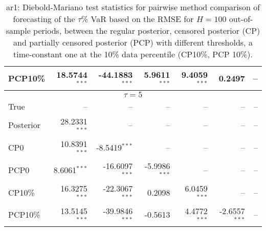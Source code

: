 {{\begin{table}
\begin{tabular}{l | rrrrrr}
PCP10\% & 18.5744$^{***}$ & -44.1883$^{***}$ & 5.9611$^{***}$ & 9.4059$^{***}$ & 0.2497\phantom{$^{***}$} &    --\phantom{$^{***}$}   \\ 
\hline 
\multicolumn{7}{c}{$\tau = 5$} \\ \hline 
True &    --\phantom{$^{***}$} &    --\phantom{$^{***}$} &    --\phantom{$^{***}$} &    --\phantom{$^{***}$} &    --\phantom{$^{***}$} &    --\phantom{$^{***}$}   \\ 
Posterior & 28.2331$^{***}$ &    --\phantom{$^{***}$} &    --\phantom{$^{***}$} &    --\phantom{$^{***}$} &    --\phantom{$^{***}$} &    --\phantom{$^{***}$}   \\ 
CP0 & 10.8391$^{***}$ & -8.5419$^{***}$ &    --\phantom{$^{***}$} &    --\phantom{$^{***}$} &    --\phantom{$^{***}$} &    --\phantom{$^{***}$}   \\ 
PCP0 & 8.6061$^{***}$ & -16.6097$^{***}$ & -5.9986$^{***}$ &    --\phantom{$^{***}$} &    --\phantom{$^{***}$} &    --\phantom{$^{***}$}   \\ 
CP10\% & 16.3275$^{***}$ & -22.3067$^{***}$ & 0.2098\phantom{$^{***}$} & 6.0459$^{***}$ &    --\phantom{$^{***}$} &    --\phantom{$^{***}$}   \\ 
PCP10\% & 13.5145$^{***}$ & -39.9846$^{***}$ & -0.5613\phantom{$^{***}$} & 4.4772$^{***}$ & -2.6557$^{***}$ &    --\phantom{$^{***}$}   \\ 
\hline 
\end{tabular}
 \caption{ar1: Diebold-Mariano test statistics for pairwise method comparison  of forecasting of the $\tau$\%  VaR  based on  the RMSE for $H=100$ out-of-sample periods,  between  the regular posterior, censored posterior (CP) and  partially censored posterior (PCP) with different thresholds,  a time-constant one at the 10\% data percentile (CP10\%, PCP 10\%). }
\label{tab:ar1_DM__T1000}  
\end{table}
}}